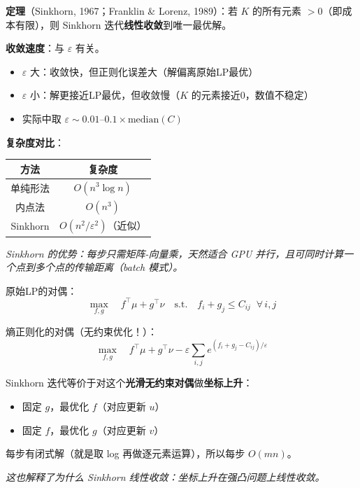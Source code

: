 \documentclass[12pt, a4paper]{ctexart}
\begin{document}
\begin{blackboard}

\textbf{定理}（Sinkhorn, 1967；Franklin \& Lorenz, 1989）：若 $K$ 的所有元素 $> 0$（即成本有限），则 Sinkhorn 迭代\textbf{线性收敛}到唯一最优解。

\textbf{收敛速度}：与 $\varepsilon$ 有关。
\begin{itemize}
    \item $\varepsilon$ 大：收敛快，但正则化误差大（解偏离原始LP最优）
    \item $\varepsilon$ 小：解更接近LP最优，但收敛慢（$K$ 的元素接近0，数值不稳定）
    \item 实际中取 $\varepsilon \sim 0.01 \text{--} 0.1 \times \text{median}(C)$
\end{itemize}

\textbf{复杂度对比}：
\begin{center}
\begin{tabular}{c|c}
方法 & 复杂度 \\
\hline
单纯形法 & $O(n^3 \log n)$ \\
内点法 & $O(n^3)$ \\
Sinkhorn & $O(n^2 / \varepsilon^2)$（近似）
\end{tabular}
\end{center}

\textit{Sinkhorn 的优势：每步只需矩阵-向量乘，天然适合 GPU 并行，且可同时计算一个点到多个点的传输距离（batch 模式）。}

\end{blackboard}

\begin{blackboard}

原始LP的对偶：
\[
\max_{f, g} \quad f^\top \mu + g^\top \nu \quad \text{s.t.} \quad f_i + g_j \leq C_{ij} \;\;\forall\, i,j
\]

熵正则化的对偶（无约束优化！）：
\[
\max_{f, g} \quad f^\top \mu + g^\top \nu - \varepsilon \sum_{i,j} e^{(f_i + g_j - C_{ij})/\varepsilon}
\]

Sinkhorn 迭代等价于对这个\textbf{光滑无约束对偶}做\textbf{坐标上升}：
\begin{itemize}
    \item 固定 $g$，最优化 $f$（对应更新 $u$）
    \item 固定 $f$，最优化 $g$（对应更新 $v$）
\end{itemize}

每步有闭式解（就是取 log 再做逐元素运算），所以每步 $O(mn)$。

\textit{这也解释了为什么 Sinkhorn 线性收敛：坐标上升在强凸问题上线性收敛。}

\end{blackboard}
\end{document}
